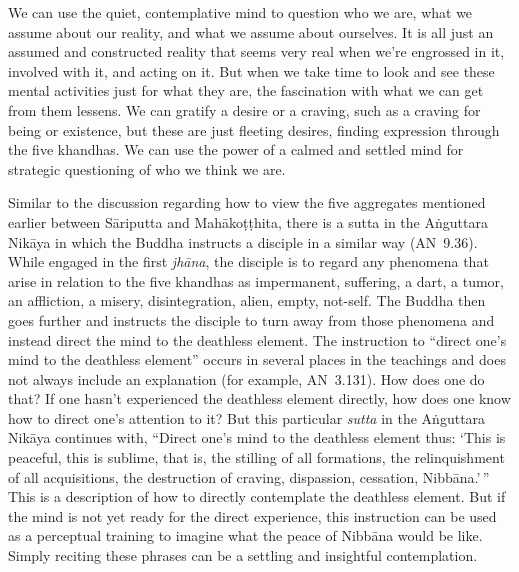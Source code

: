 We can use the quiet, contemplative mind to question \linebreak who we are, what we assume about our reality, and what we assume about ourselves. It is all just an assumed and constructed reality that seems very real when we're engrossed in it, involved with it, and acting on it. But when we take time to look and see these mental activities just for what they are, the fascination with what we can get from them lessens. We can gratify a desire or a craving, such as a craving for being or existence, but these are just fleeting desires, finding expression through the five khandhas. We can use the power of a calmed and settled mind for strategic questioning of who we think we are.

\enlargethispage{1\baselineskip}
Similar to the discussion regarding how to view the five aggregates mentioned earlier between Sāriputta and Mahākoṭṭhita, there is a sutta in the Aṅguttara Nikāya in which the Buddha instructs a disciple in a similar way \mbox{(AN 9.36)}. While engaged in the first \emph{jhāna}, the disciple is to regard any phenomena that arise in relation to the five khandhas as impermanent, suffering, a dart, a tumor, an affliction, a misery, disintegration, alien, empty, not-self. The Buddha then goes further and instructs the disciple to turn away from those phenomena and instead direct the mind to the deathless element. The instruction to ``direct one's mind to the deathless element'' occurs in several places in the teachings and does not always include an explanation (for example, \mbox{AN 3.131}). How does one do that? If one hasn't experienced the deathless element directly, how does one know how to direct one's attention to it? But this particular \emph{sutta} in the Aṅguttara Nikāya continues with, ``Direct one's mind to the deathless element thus: `This is peaceful, this is sublime, that is, the stilling of all formations, the relinquishment of all acquisitions, the destruction of craving, dispassion, cessation, Nibbāna.'\,'' This is a description of how to directly contemplate the deathless element. But if the mind is not yet ready for the direct experience, this instruction can be used as a perceptual training to imagine what the peace of Nibbāna would be like. Simply reciting these phrases can be a settling and insightful contemplation.

